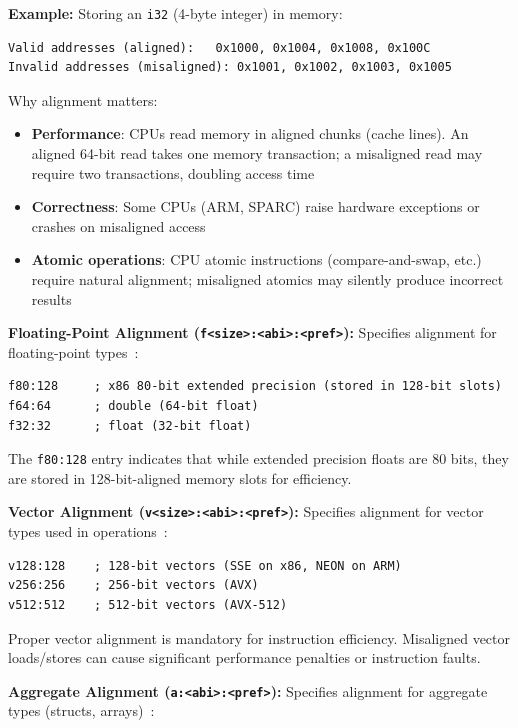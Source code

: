 \textbf{Example:} Storing an \texttt{i32} (4-byte integer) in memory:

\begin{lstlisting}[style=ir]
Valid addresses (aligned):   0x1000, 0x1004, 0x1008, 0x100C
Invalid addresses (misaligned): 0x1001, 0x1002, 0x1003, 0x1005
\end{lstlisting}

Why alignment matters:
\begin{itemize}[noitemsep]
  \item \textbf{Performance}: CPUs read memory in aligned chunks (cache lines). An aligned 64-bit read takes one memory transaction; a misaligned read may require two transactions, doubling access time
  \item \textbf{Correctness}: Some CPUs (ARM, SPARC) raise hardware exceptions or crashes on misaligned access
  \item \textbf{Atomic operations}: CPU atomic instructions (compare-and-swap, etc.) require natural alignment; misaligned atomics may silently produce incorrect results
\end{itemize}

\textbf{Floating-Point Alignment (\texttt{f<size>:<abi>:<pref>}):} Specifies alignment for floating-point types~\cite{llvmlangref}:

\begin{lstlisting}[style=ir]
f80:128     ; x86 80-bit extended precision (stored in 128-bit slots)
f64:64      ; double (64-bit float)
f32:32      ; float (32-bit float)
\end{lstlisting}

The \texttt{f80:128} entry indicates that while  extended precision floats are 80 bits, they are stored in 128-bit-aligned memory slots for efficiency.

\textbf{Vector Alignment (\texttt{v<size>:<abi>:<pref>}):} Specifies alignment for vector types used in  operations~\cite{llvmlangref}:

\begin{lstlisting}[style=ir]
v128:128    ; 128-bit vectors (SSE on x86, NEON on ARM)
v256:256    ; 256-bit vectors (AVX)
v512:512    ; 512-bit vectors (AVX-512)
\end{lstlisting}

Proper vector alignment is mandatory for  instruction efficiency. Misaligned vector loads/stores can cause significant performance penalties or instruction faults.

\textbf{Aggregate Alignment (\texttt{a:<abi>:<pref>}):} Specifies alignment for aggregate types (structs, arrays)~\cite{llvmlangref}:

